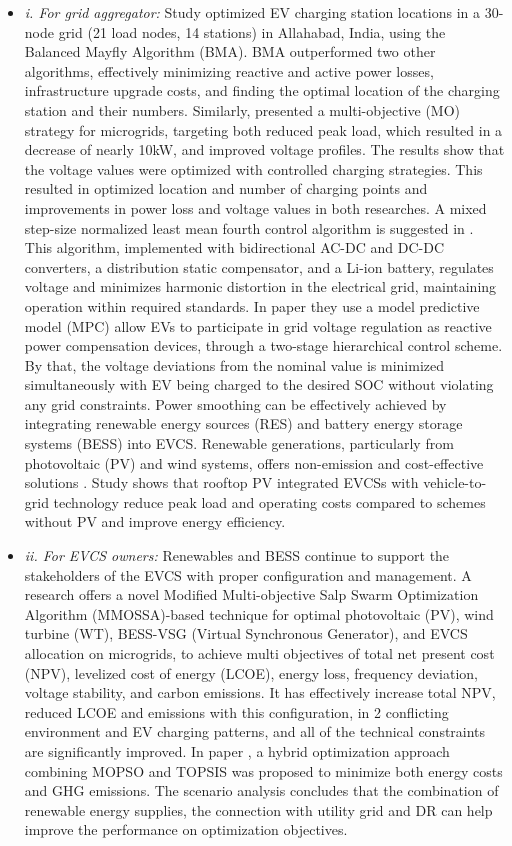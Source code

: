 \documentclass{thesis}
\begin{document}
\begin{itemize}
    \item \textit{i. For grid aggregator:} Study \cite{86_greenin} optimized EV charging station locations in a 30-node grid (21 load nodes, 14 stations) in Allahabad, India, using the Balanced Mayfly Algorithm (BMA). BMA outperformed two other algorithms, effectively minimizing reactive and active power losses, infrastructure upgrade costs, and finding the optimal location of the charging station and their numbers. Similarly, \cite{87_greenin} presented a multi-objective (MO) strategy for microgrids, targeting both reduced peak load, which resulted in a decrease of nearly 10kW, and improved voltage profiles. The results show that the voltage values were optimized with controlled charging strategies. This resulted in optimized location and number of charging points and improvements in power loss and voltage values in both researches. A mixed step-size normalized least mean fourth control algorithm is suggested in \cite{Balasundar2022}. This algorithm, implemented with bidirectional AC-DC and DC-DC converters, a distribution static compensator, and a Li-ion battery, regulates voltage and minimizes harmonic distortion in the electrical grid, maintaining operation within required standards. In paper \cite{li2019mpc} they use a model predictive model (MPC) allow EVs to participate in grid voltage regulation as reactive power compensation devices, through a two-stage hierarchical control scheme. By that, the voltage deviations from the nominal value is minimized simultaneously with EV being charged to the desired SOC without violating any grid constraints. Power smoothing can be effectively achieved by integrating renewable energy sources (RES) and battery energy storage systems (BESS) into EVCS. Renewable generations, particularly from photovoltaic (PV) and wind systems, offers non-emission and cost-effective solutions \cite{RES}. Study \cite{Zhiyong2020} shows that rooftop PV integrated EVCSs with vehicle-to-grid technology reduce peak load and operating costs compared to schemes without PV and improve energy efficiency.
    \item \textit{ii. For EVCS owners:} Renewables and BESS continue to support the stakeholders of the EVCS with proper configuration and management. A research \cite{MMOSSA} offers a novel Modified Multi-objective Salp Swarm Optimization Algorithm (MMOSSA)-based technique for optimal photovoltaic (PV), wind turbine (WT), BESS-VSG (Virtual Synchronous Generator), and EVCS allocation on microgrids, to achieve multi objectives of total net present cost (NPV), levelized cost of energy (LCOE), energy loss, frequency deviation, voltage stability, and carbon emissions. It has effectively increase total NPV, reduced LCOE and emissions with this configuration, in 2 conflicting environment and EV charging patterns, and all of the technical constraints are significantly improved. In paper \cite{Sun2020}, a hybrid optimization approach combining MOPSO and TOPSIS was proposed to minimize both energy costs and GHG emissions. The scenario analysis concludes that the combination of renewable energy supplies, the connection with utility grid and DR can help improve the performance on optimization objectives. 

\end{itemize}
\end{document}
